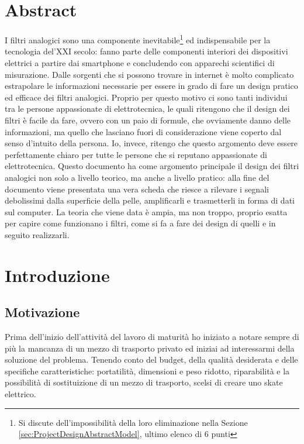 \documentclass[a4paper, 10pt, final]{article} %
\begin{document}
    \section*{Abstract}
    \par I filtri analogici sono una componente inevitabile\footnote{Si discute dell'impossibilit\`{a} della loro eliminazione nella Sezione \ref{sec:ProjectDesignAbstractModel}, ultimo elenco di 6 punti} ed indispensabile per la tecnologia del'XXI secolo: fanno parte delle componenti interiori dei dispositivi elettrici a partire dai smartphone e concludendo con apparechi scientifici di misurazione.
    Dalle sorgenti che si possono trovare in internet \`{e} molto complicato estrapolare le informazioni necessarie per essere in grado di fare un design pratico ed efficace dei filtri analogici.
    Proprio per questo motivo ci sono tanti individui tra le persone appassionate di elettrotecnica, le quali ritengono che il design dei filtri \`{e} facile da fare, ovvero con un paio di formule, che ovviamente danno delle informazioni, ma quello che lasciano fuori di considerazione viene coperto dal senso d'intuito della persona.
    Io, invece, ritengo che questo argomento deve essere perfettamente chiaro per tutte le persone che si reputano appassionate di elettrotecnica.
    Questo documento ha come argomento principale il design dei filtri analogici non solo a livello teorico, ma anche a livello pratico: alla fine del documento viene presentata una vera scheda che riesce a rilevare i segnali debolissimi dalla superficie della pelle, amplificarli e trasmetterli in forma di dati sul computer.
    La teoria che viene data \`{e} ampia, ma non troppo, proprio esatta per capire come funzionano i filtri, come si fa a fare dei design di quelli e in seguito realizzarli.
    \clearpage
    \tableofcontents

    \clearpage
    \section{Introduzione}\label{sec:Intro}
    \subsection{Motivazione}\label{sec:IntroMotivation}
    Prima dell'inizio dell'attivit\`{a} del lavoro di maturit\`{a} ho iniziato a notare sempre di pi\`{u} la mancanza di un mezzo di trasporto privato ed iniziai ad interessarmi della soluzione del problema.
    Tenendo conto del budget, della qualit\`{a} desiderata e delle specifiche caratteristiche: portatilit\`{a}, dimensioni e peso ridotto, riparabilit\`{a} e la possibilit\`{a} di sostituizione di un mezzo di trasporto, scelsi di creare uno skate elettrico.
    
\end{document}
